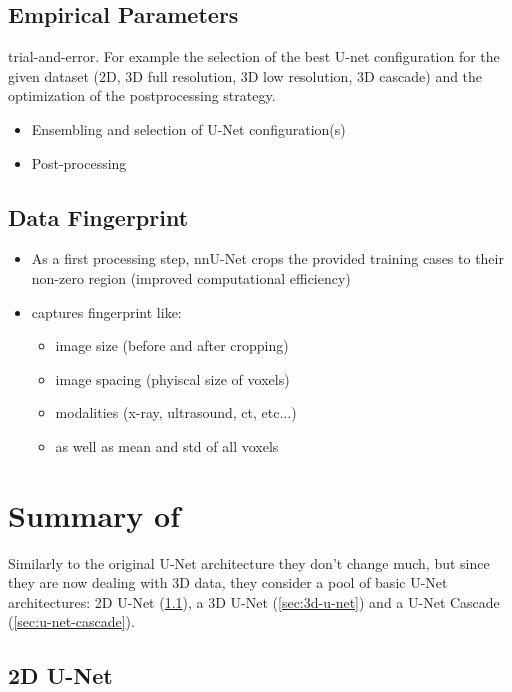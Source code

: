 \documentclass[11pt]{article}
\begin{document}
\subsection{Empirical Parameters}

trial-and-error. For example the selection of the best U-net configuration for the given dataset (2D, 3D full resolution, 3D low resolution, 3D cascade) and the optimization of the postprocessing strategy.

\begin{itemize}
    \item Ensembling and selection of U-Net configuration(s)
    \item Post-processing
\end{itemize}

\subsection{Data Fingerprint}

\begin{itemize}
    \item As a first processing step, nnU-Net crops the provided training cases to their non-zero region (improved computational efficiency)
    \item captures fingerprint like: \begin{itemize}
        \item image size (before and after cropping)
        \item image spacing (phyiscal size of voxels)
        \item modalities (x-ray, ultrasound, ct, etc...)
        \item as well as mean and std of all voxels
    \end{itemize}
\end{itemize}

\section{Summary of~\cite{nnunet}}

Similarly to the original U-Net architecture they don't change much, but since they are now dealing with 3D data, they consider a pool of basic U-Net architectures: 2D U-Net (\ref{sec:2d-u-net}), a 3D U-Net (\ref{sec:3d-u-net}) and a U-Net Cascade (\ref{sec:u-net-cascade}).

\subsection{2D U-Net}\label{sec:2d-u-net}
\end{document}
